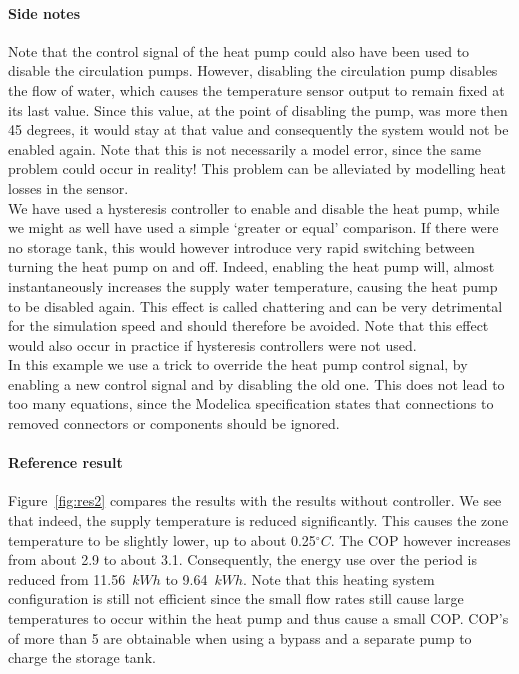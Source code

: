 \documentclass[10pt,a4paper]{article}
\begin{document}
\paragraph{Side notes}
Note that the control signal of the heat pump could also have been used to disable
the circulation pumps.
However, disabling the circulation pump disables the flow of water,
which causes the temperature sensor output to remain fixed at
its last value.
Since this value, at the point of disabling the pump, was more then 45 degrees,
it would stay at that value and consequently the system would not be enabled again.
Note that this is not necessarily a model error, since the same problem could
occur in reality! This problem can be alleviated by modelling
heat losses in the sensor.\\

We have used a hysteresis controller to enable and disable the heat pump,
while we might as well have used a simple `greater or equal' comparison.
If there were no storage tank,
this would however introduce very rapid switching between turning the heat pump on
and off. Indeed, enabling the heat pump will, almost instantaneously increases the 
supply water temperature, causing the heat pump to be disabled again.
This effect is called chattering and can be very detrimental for the simulation speed 
and should therefore be avoided.
Note that this effect would also occur in practice if hysteresis controllers were not used.\\

In this example we use a trick to override the heat pump control signal, by enabling a new
control signal and by disabling the old one. This does not lead
to too many equations, since the Modelica specification states that 
connections to removed connectors or components should be ignored.

\newpage

\paragraph{Reference result}
Figure~\ref{fig:res2} compares the results with the results without controller.
We see that indeed, the supply temperature is reduced significantly.
This causes the zone temperature to be slightly lower, up to about 0.25$^{\circ}C$.
The COP however increases from about 2.9 to about 3.1.
Consequently, the energy use over the period is reduced from 11.56~$kWh$
to 9.64~$kWh$. Note that this heating system configuration is still 
not efficient since the small flow rates still cause 
large temperatures to occur within the heat pump
and thus cause a small COP.
COP's of more than 5 are obtainable when using a bypass and a separate
pump to charge the storage tank.\\
\end{document}
